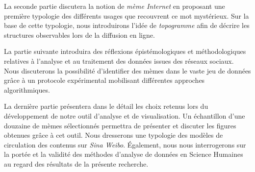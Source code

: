 La seconde partie discutera la notion de \textit{mème Internet} en proposant une première typologie des différents usages que recouvrent ce mot mystérieux. Sur la base de cette typologie, nous introduirons l'idée de \textit{topogramme} afin de décrire les structures observables lors de la diffusion en ligne.

La partie suivante introduira des réflexions épistémologiques et méthodologiques relatives à l'analyse et au traitement des données issues des réseaux sociaux. Nous discuterons la possibilité d'identifier des mèmes dans le vaste jeu de données grâce à un protocole expérimental mobilisant différentes approches algorithmiques.

La dernière partie présentera dans le détail les choix retenus lors du développement de notre outil d'analyse et de visualisation. Un échantillon d'une douzaine de mèmes sélectionnés permettra de présenter et discuter les figures obtenues grâce à cet outil. Nous dresserons une typologie des modèles de circulation des contenus sur \textit{Sina Weibo}. \'Egalement, nous nous interrogerons sur la portée et la validité des méthodes d'analyse de données en Science Humaines au regard des résultats de la présente recherche.






